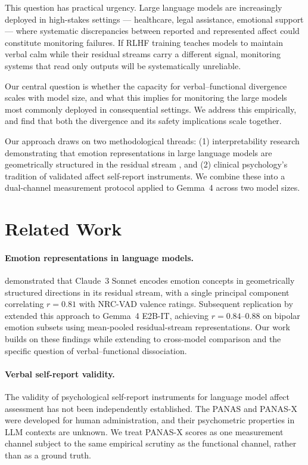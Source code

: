 \documentclass[11pt]{article}
\begin{document}
This question has practical urgency. Large language models are increasingly deployed in high-stakes
settings --- healthcare, legal assistance, emotional support --- where systematic discrepancies
between reported and represented affect could constitute monitoring failures. If RLHF training
teaches models to maintain verbal calm while their residual streams carry a different signal,
monitoring systems that read only outputs will be systematically unreliable.

Our central question is whether the capacity for verbal--functional divergence scales with
model size, and what this implies for monitoring the large models most commonly deployed in
consequential settings. We address this empirically, and find that both the divergence and
its safety implications scale together.

Our approach draws on two methodological threads: (1) interpretability research demonstrating
that emotion representations in large language models are geometrically structured in the residual
stream \citep{anthropic2026emotion}, and (2) clinical psychology's tradition of validated affect
self-report instruments. We combine these into a dual-channel measurement protocol applied to
Gemma~4 across two model sizes.

\section{Related Work}

\paragraph{Emotion representations in language models.}
\citet{anthropic2026emotion} demonstrated that Claude~3 Sonnet encodes emotion concepts in
geometrically structured directions in its residual stream, with a single principal component
correlating $r = 0.81$ with NRC-VAD valence ratings. Subsequent replication by
\citet{duffy2026} extended this approach to Gemma~4 E2B-IT, achieving $r = 0.84$--$0.88$ on
bipolar emotion subsets using mean-pooled residual-stream representations. Our work builds on
these findings while extending to cross-model comparison and the specific question of
verbal--functional dissociation.

\paragraph{Verbal self-report validity.}
The validity of psychological self-report instruments for language model affect assessment has not
been independently established. The PANAS \citep{watsonclark1988} and PANAS-X
\citep{watsonclark1994} were developed for human administration, and their psychometric properties
in LLM contexts are unknown. We treat PANAS-X scores as one measurement channel subject to the
same empirical scrutiny as the functional channel, rather than as a ground truth.
\end{document}
